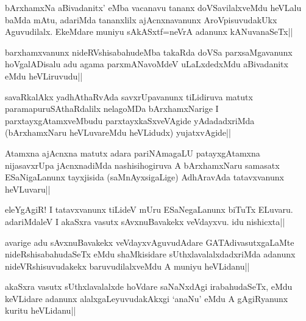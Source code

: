 \begin{artha}
bArxhamxNa aBivadanitx' eMba vacanavu tananx doVSavilalxveMdu heVLalu baMda mAtu, adariMda tananxlilx ajAcnxnavanunx AroVpisuvudakUkx Aguvudilalx. EkeMdare muniyu sAkASxtf=neVrA adanunx kANuvanaSeTx||
\end{artha}


\begin{artha}
barxhamxvanunx nideRVshisabahudeMba takaRda doVSa parxsaMgavanunx hoVgalADisalu adu agama parxmANavoMdeV uLaLxdedxMdu aBivadanitx eMdu heVLiruvudu||
\end{artha}

\begin{artha}
savaRkalAkx yadhAthaRvAda savxrUpavanunx tiLidiruva matutx paramapuruSAthaRdalilx nelagoMDa bArxhamxNarige I parxtayxgAtamxveMbudu parxtayxkaSxveVAgide yAdadadxriMda (bArxhamxNaru heVLuvareMdu heVLidudx) yujatxvAgide||
\end{artha}

\begin{artha}
Atamxna ajAcnxna matutx adara pariNAmagaLU patayxgAtamxna nijasavxrUpa jAcnxnadiMda nashisihogiruva A bArxhamxNaru samasatx ESaNigaLanunx tayxjisida (saMnAyxsigaLige) AdhAravAda tatavxvanunx heVLuvaru||
\end{artha}

\begin{artha}
eleYgAgiR! I tatavxvanunx tiLideV mUru ESaNegaLanunx biTuTx ELuvaru. adariMdaleV I akaSxra vasutx sAvxnuBavakekx veVdayxvu. idu nishicxta||
\end{artha}


\begin{artha}
avarige adu sAvxnuBavakekx veVdayxvAguvudAdare GATAdivasutxgaLaMte nideRshisabahudaSeTx eMdu shaMkisidare sUthxlavalalxdadxriMda adanunx nideVRshisuvudakekx baruvudilalxveMdu A muniyu heVLidanu||
\end{artha}


\begin{artha}
akaSxra vasutx sUthxlavalalxde hoVdare saNaNxdAgi irabahudaSeTx, eMdu keVLidare adanunx alalxgaLeyuvudakAkxgi `anaNu' eMdu A gAgiRyanunx kuritu heVLidanu||
\end{artha}


